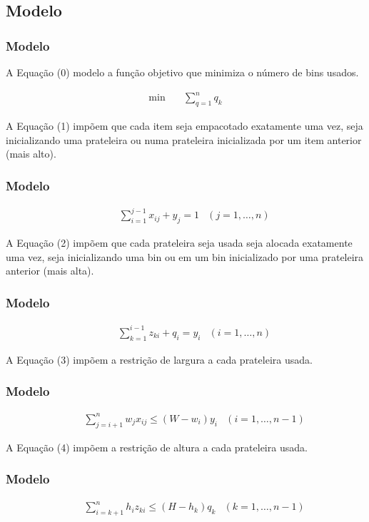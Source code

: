 \documentclass{beamer}
\begin{document}
\subsection{Modelo}

\begin{frame}
\frametitle {Modelo}

A Equação (0) modelo a função objetivo que minimiza o número de bins usados.

{\small
\begin{align}
\min \quad
& \sum_{q=1}^{n} q_k 
\end{align} 
}

\end{frame}

\begin{frame}

A Equação (1) impõem que cada item seja empacotado exatamente uma vez, seja inicializando uma prateleira ou numa prateleira inicializada por um item anterior (mais alto).

\frametitle {Modelo}

{\small
\begin{align}
\quad
& \sum_{i=1}^{j-1} x_{ij} + y_j = 1 &  (j = 1, \dots, n)  
\end{align} 
}
\end{frame}

\begin{frame}

A Equação (2) impõem que cada prateleira seja usada seja alocada exatamente uma vez, seja inicializando uma bin ou em um bin inicializado por uma prateleira anterior (mais alta).

\frametitle {Modelo}

{\small
\begin{align}
\quad
& \sum_{k=1}^{i-1} z_{ki} + q_i = y_i  & (i = 1, \dots, n) 
\end{align} 
}
\end{frame}

\begin{frame}
A Equação (3) impõem a restrição de largura a cada prateleira usada.

\frametitle {Modelo}

{\small
\begin{align}
\quad
& \sum_{j=i+1}^{n} w_j x_{ij} \leq (W - w_i)y_i  & (i = 1, \dots, n-1) 
\end{align} 
}
\end{frame}

\begin{frame}

A Equação (4) impõem a restrição de altura a cada prateleira usada.

\frametitle {Modelo}

{\small
\begin{align}
\quad
& \sum_{i=k+1}^{n} h_i z_{ki} \leq (H - h_k)q_k  & (k = 1, \dots, n-1)
\end{align} 
}
\end{frame}
\end{document}
